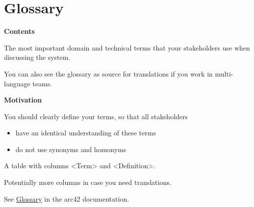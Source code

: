 \hypertarget{section-glossary}{%
\section{Glossary}\label{section-glossary}}

\textbf{Contents}

The most important domain and technical terms that your stakeholders use
when discussing the system.

You can also see the glossary as source for translations if you work in
multi-language teams.

\textbf{Motivation}

You should clearly define your terms, so that all stakeholders

\begin{itemize}
\item
  have an identical understanding of these terms
\item
  do not use synonyms and homonyms
\end{itemize}

A table with columns \textless Term\textgreater{} and
\textless Definition\textgreater.

Potentially more columns in case you need translations.

See \href{https://docs.arc42.org/section-12/}{Glossary} in the arc42
documentation.

